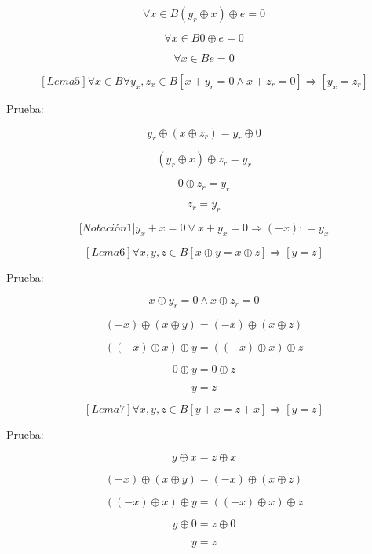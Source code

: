 \documentclass[
]{article}
\begin{document}
\begin{enumerate}
\begin{enumerate}
\begin{enumerate}
      \[\forall{x \in B}\left( {y_{r} \oplus x} \right) \oplus {e = 0}\]

      \[\forall{x \in B}0 \oplus {e = 0}\]

      \[\forall{x \in B}{e = 0}\]

      \[\left\lbrack {{Lema}5} \right\rbrack\forall{x \in B}\forall y_{x},{z_{x} \in B}\left\lbrack {{{x + y_{r}} = {{0 \land x} + z_{r}}} = 0} \right\rbrack\Rightarrow\left\lbrack {y_{x} = z_{r}} \right\rbrack\]

      Prueba:

      \[y_{r} \oplus {\left( {x \oplus z_{r}} \right) = y_{r}} \oplus 0\]

      \[\left( {y_{r} \oplus x} \right) \oplus {z_{r} = y_{r}}\]

      \[0 \oplus {z_{r} = y_{r}}\]

      \[z_{r} = y_{r}\]

      \[{\lbrack{{Notación}1}\rbrack}{{{y_{x} + x} = {{0 \vee x} + y_{x}}} = 0}\Rightarrow\left( {- x} \right){: = y_{x}}\]

      \[\left\lbrack {{Lema}6} \right\rbrack\forall x,y,{z \in B}\left\lbrack {x \oplus {y = x} \oplus z} \right\rbrack\Rightarrow\left\lbrack {y = z} \right\rbrack\]

      Prueba:

      \[x \oplus {y_{r} = {0 \land x}} \oplus {z_{r} = 0}\]

      \[{({- x})} \oplus {{({x \oplus y})} = {({- x})}} \oplus {({x \oplus z})}\]

      \[\left( {{({- x})} \oplus x} \right) \oplus {y = \left( {{({- x})} \oplus x} \right)} \oplus z\]

      \[0 \oplus {y = 0} \oplus z\]

      \[y = z\]

      \[\left\lbrack {{Lema}7} \right\rbrack\forall x,y,{z \in B}\left\lbrack {{y + x} = {z + x}} \right\rbrack\Rightarrow\left\lbrack {y = z} \right\rbrack\]

      Prueba:

      \[y \oplus {x = z} \oplus x\]

      \[{({- x})} \oplus {{({x \oplus y})} = {({- x})}} \oplus {({x \oplus z})}\]

      \[\left( {{({- x})} \oplus x} \right) \oplus {y = \left( {{({- x})} \oplus x} \right)} \oplus z\]

      \[y \oplus {0 = z} \oplus 0\]

      \[y = z\]


\end{enumerate}
\end{enumerate}
\end{enumerate}
\end{document}
